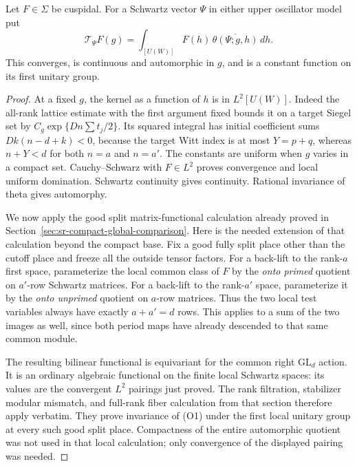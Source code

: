 \begin{srlemma}
\label{lem:sr-theta-backlift-constant-all-signatures}
Let \(F\in\Sigma\) be cuspidal. For a Schwartz vector \(\Psi\)
in either upper oscillator model put
\[
 \mathcal T_\Psi F(g)
     =\int_{[U(W)]}F(h)\,
                    \overline{\theta(\Psi;g,h)}\,dh .
 \tag{O1}\label{eq:sr-theta-backlift-all-signatures}
\]
This converges, is continuous and automorphic in \(g\), and
is a constant function on its first unitary group.
\end{srlemma}

\begin{proof}
At a fixed \(g\), the kernel as a function of \(h\) is in \(L^2[U(W)]\).
Indeed the all-rank lattice estimate with the first argument
fixed bounds it on a target Siegel set by
\(C_g\exp\{Dn\sum t_j/2\}\).
Its squared integral has initial coefficient sums
\(Dk(n-d+k)<0\), because the target Witt index is at most
\(Y=p+q\), whereas
\(n+Y<d\) for both \(n=a\) and \(n=a'\).
The constants are uniform when \(g\) varies in a compact set.
Cauchy--Schwarz with \(F\in L^2\) proves convergence and local
uniform domination. Schwartz continuity gives continuity.
Rational invariance of theta gives automorphy.

We now apply the good split matrix-functional calculation already
proved in Section~\ref{sec:sr-compact-global-comparison}.
Here is the needed extension of that calculation beyond the
compact base. Fix a good fully split place other than the cutoff
place and freeze all the outside tensor factors.
For a back-lift to the rank-\(a\) first space, parameterize the
local common class of \(F\) by the \emph{onto primed} quotient
on \(a'\)-row Schwartz matrices. For a back-lift to the
rank-\(a'\) space, parameterize it by the \emph{onto unprimed}
quotient on \(a\)-row matrices. Thus the two local test
variables always have exactly \(a+a'=d\) rows.
This applies to a sum of the two images as well, since both
period maps have already descended to that same common module.

The resulting bilinear functional is equivariant for the common
right \(\mathrm{GL}_d\) action. It is an ordinary algebraic
functional on the finite local Schwartz spaces: its values are
the convergent \(L^2\) pairings just proved.
The rank filtration, stabilizer modular mismatch, and full-rank
fiber calculation from that section therefore apply verbatim.
They prove invariance of (O1) under the first local unitary group
at every such good split place. Compactness of the entire
automorphic quotient was not used in that local calculation;
only convergence of the displayed pairing was needed.


\end{proof}
